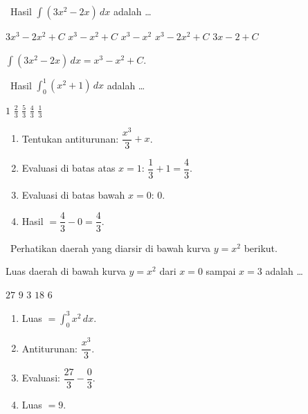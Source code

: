 \documentclass[11pt,a4paper]{exam}
\newenvironment{langkah}{%
  \begin{enumerate}[label=\textbf{Langkah \arabic*:},leftmargin=2.6em,
    itemsep=2pt,topsep=2pt]}{\end{enumerate}}
\newcommand{\Inter}{{\footnotesize\textsf{\textcolor{biru}{[Intermediate]}}}\ }
\newcommand{\Adv}{{\footnotesize\textsf{\textcolor{oranye}{[Advanced]}}}\ }
\begin{document}
\begin{questions}
\question \Inter Hasil $\displaystyle\int (3x^{2}-2x)\,dx$ adalah \dots
\begin{choices}
\choice $3x^{3} - 2x^{2} + C$ \CorrectChoice $x^{3} - x^{2} + C$ \choice $x^{3} - x^{2}$
\choice $x^{3} - 2x^{2} + C$ \choice $3x - 2 + C$
\end{choices}
\begin{solution}$\displaystyle\int (3x^{2}-2x)\,dx = x^{3} - x^{2} + C.$\end{solution}

\question \Adv Hasil $\displaystyle\int_{0}^{1} (x^{2}+1)\,dx$ adalah \dots
\begin{choices}
\choice $1$ \choice $\tfrac{2}{3}$ \choice $\tfrac{5}{3}$ \CorrectChoice $\tfrac{4}{3}$ \choice $\tfrac{1}{3}$
\end{choices}
\begin{solution}
\begin{langkah}
\item Tentukan antiturunan: $\dfrac{x^{3}}{3} + x$.
\item Evaluasi di batas atas $x=1$: $\dfrac{1}{3} + 1 = \dfrac{4}{3}$.
\item Evaluasi di batas bawah $x=0$: $0$.
\item Hasil $= \dfrac{4}{3} - 0 = \dfrac{4}{3}$.
\end{langkah}
\end{solution}

\question \Adv Perhatikan daerah yang diarsir di bawah kurva $y = x^{2}$ berikut.

\begin{center}
\end{center}

Luas daerah di bawah kurva $y = x^{2}$ dari $x = 0$ sampai $x = 3$ adalah \dots
\begin{choices}
\choice $27$ \CorrectChoice $9$ \choice $3$ \choice $18$ \choice $6$
\end{choices}
\begin{solution}
\begin{langkah}
\item Luas $= \displaystyle\int_{0}^{3} x^{2}\,dx$.
\item Antiturunan: $\dfrac{x^{3}}{3}$.
\item Evaluasi: $\dfrac{27}{3} - \dfrac{0}{3}$.
\item Luas $= 9$.
\end{langkah}
\end{solution}


\end{questions}
\end{document}
